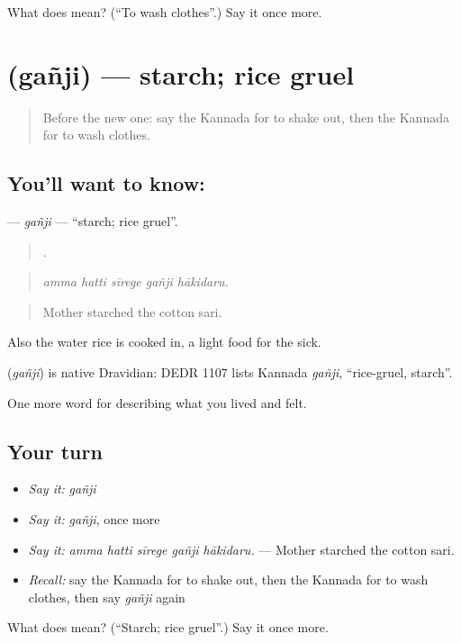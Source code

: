 \begin{tcolorbox}[breakable,colback=teal!4,colframe=teal!35!black,title={Before you move on}]
What does  mean? (\textquotedblleft{}To wash clothes\textquotedblright{}.) Say it once more.
\end{tcolorbox}
\section[\texorpdfstring{\kn{ಗಂಜಿ} (gañji)}{ಗಂಜಿ (gañji)}]{ (gañji) — starch; rice gruel}

\label{lesson:KA-C545-ganji}



\begin{quote}
Before the new one: say the Kannada for to shake out, then the Kannada for to wash clothes.
\end{quote}

\subsection*{You'll want to know: }
\textbf{} — \emph{gañji} — \textquotedblleft{}starch; rice gruel\textquotedblright{}.

\begin{quote}
    .
\end{quote}

\begin{quote}
\emph{amma hatti sīrege gañji hākidaru.}
\end{quote}

\begin{quote}
Mother starched the cotton sari.
\end{quote}

Also the water rice is cooked in, a light food for the sick.

\begin{cousinweb}
\textbf{} (\emph{gañji}) is native Dravidian: DEDR 1107 lists Kannada \emph{gañji}, \textquotedblleft{}rice-gruel, starch\textquotedblright{}.
\end{cousinweb}

\begin{grammarlens}[title={What you've built}]
One more word for describing what you lived and felt.
\end{grammarlens}

\subsection*{Your turn}
\begin{itemize}
\raggedright
  \item \emph{Say it:} \emph{gañji}
  \item \emph{Say it:} \emph{gañji}, once more
  \item \emph{Say it:} \emph{amma hatti sīrege gañji hākidaru.} — Mother starched the cotton sari.
  \item \emph{Recall:} say the Kannada for to shake out, then the Kannada for to wash clothes, then say \emph{gañji} again
\end{itemize}

\begin{tcolorbox}[breakable,colback=teal!4,colframe=teal!35!black,title={Before you move on}]
What does  mean? (\textquotedblleft{}Starch; rice gruel\textquotedblright{}.) Say it once more.
\end{tcolorbox}
